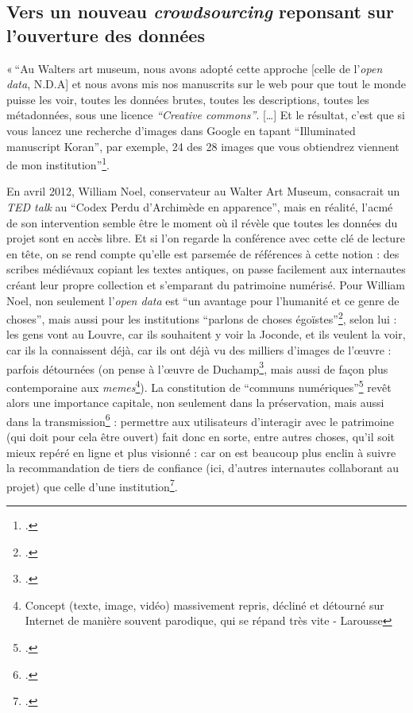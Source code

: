 \newpage

\subsection{Vers un nouveau \textit{crowdsourcing} reponsant sur l'ouverture des données}


« \enquote{Au Walters art museum, nous avons adopté cette approche [celle de l’\textit{open data}, N.D.A] et nous avons mis nos manuscrits sur le web pour que tout le monde puisse les voir, toutes les données brutes, toutes les descriptions, toutes les métadonnées, sous une licence \textit{“Creative commons”}. […] Et le résultat, c’est que si vous lancez une recherche d’images dans Google en tapant “Illuminated manuscript Koran”, par exemple, 24 des 28 images que vous obtiendrez viennent de mon institution}\footcite{noel_william_nodate}.

En avril 2012, William Noel, conservateur au Walter Art Museum, consacrait un \textit{TED talk} au \enquote{Codex Perdu d’Archimède en apparence}, mais en réalité, l’acmé de son intervention semble être le moment où il révèle que toutes les données du projet sont en accès libre. Et si l’on regarde la conférence avec cette clé de lecture en tête, on se rend compte qu’elle est parsemée de références à cette notion : des scribes médiévaux copiant les textes antiques, on passe facilement aux internautes créant leur propre collection et s’emparant du patrimoine numérisé. Pour William Noel, non seulement l’\textit{open data} est \enquote{un avantage pour l’humanité et ce genre de choses}, mais aussi pour les institutions \enquote{parlons de choses égoïstes}\footcite[à 13 minutes 26secondes]{noel_william_nodate}, selon lui : les gens vont au Louvre, car ils souhaitent y voir la Joconde, et ils veulent la voir, car ils la connaissent déjà, car ils ont déjà vu des milliers d’images de l’œuvre : parfois détournées (on pense à l’œuvre de Duchamp\footcite{zotero-368}, mais aussi de façon plus contemporaine aux \textit{memes}\footnote{Concept (texte, image, vidéo) massivement repris, décliné et détourné sur Internet de manière souvent parodique, qui se répand très vite - Larousse}). La constitution de \enquote{communs numériques}\footcite[p. 173]{bermes2024} revêt alors une importance capitale, non seulement dans la préservation, mais aussi dans la transmission\footcite[p. 175]{bermes2024} : permettre aux utilisateurs d’interagir avec le patrimoine (qui doit pour cela être ouvert) fait donc en sorte, entre autres choses, qu’il soit mieux repéré en ligne et plus visionné : car on est beaucoup plus enclin à suivre la recommandation de tiers de confiance (ici, d’autres internautes collaborant au projet) que celle d’une institution\footcite{ertzscheid2019}.

